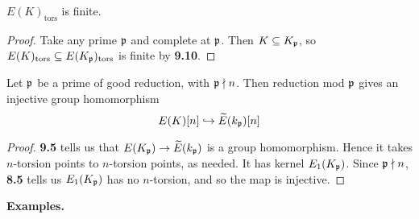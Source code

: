 \documentclass[10pt,a4paper]{article}
\begin{document}
\begin{lemma}
  $E(K)_{\text{tors}}$ is finite.
\end{lemma}
\begin{proof}
  Take any prime $\mathfrak{p}$ and complete at $\mathfrak{p}$. Then $K\subseteq K_{\mathfrak{p}}$, so $E(K)_{\text{tors}} \subseteq E(K_{\mathfrak{p}})_{\text{tors}}$ is finite by \textbf{9.10}.
\end{proof}
\begin{lemma}
  Let $\mathfrak{p}$ be a prime of good reduction, with $\mathfrak{p}\nmid n$. Then reduction mod $\mathfrak{p}$ gives an injective group homomorphism
  \[E(K)[n] \hookrightarrow \widetilde{E}(k_{\mathfrak{p}})[n]\]
\end{lemma}
\begin{proof}
  \textbf{9.5} tells us that $E(K_{\mathfrak{p}}) \to \widetilde{E}(k_{\mathfrak{p}})$ is a group homomorphism. Hence it takes $n$-torsion points to $n$-torsion points, as needed. It has kernel $E_1(K_{\mathfrak{p}})$. Since $\mathfrak{p} \nmid n$, \textbf{8.5} tells us $E_1(K_{\mathfrak{p}})$ has no $n$-torsion, and so the map is injective.
\end{proof}
\textbf{Examples.}
\end{document}
